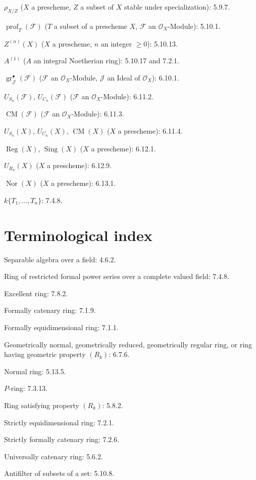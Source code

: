 $\rho_{X/Z}$ ($X$ a prescheme, $Z$ a subset of $X$ stable under
specialization): 5.9.7.

$\operatorname{prof}_T(\mathscr F)$ ($T$ a subset of a prescheme $X$,
$\mathscr F$ an $\mathcal O_X$-Module): 5.10.1.

$Z^{(n)}(X)$ ($X$ a prescheme, $n$ an integer $\geq0$): 5.10.13.

$A^{(1)}$ ($A$ an integral Noetherian ring): 5.10.17 and 7.2.1.

$\operatorname{gr}_{\mathscr J}^{\bullet}(\mathscr F)$ ($\mathscr F$ an
$\mathcal O_X$-Module, $\mathscr J$ an Ideal of $\mathcal O_X$): 6.10.1.

$U_{S_n}(\mathscr F)$, $U_{C_n}(\mathscr F)$ ($\mathscr F$ an
$\mathcal O_X$-Module): 6.11.2.

$\operatorname{CM}(\mathscr F)$ ($\mathscr F$ an $\mathcal O_X$-Module): 6.11.3.

$U_{S_n}(X)$, $U_{C_n}(X)$, $\operatorname{CM}(X)$ ($X$ a prescheme): 6.11.4.

$\operatorname{Reg}(X)$, $\operatorname{Sing}(X)$ ($X$ a prescheme): 6.12.1.

$U_{R_n}(X)$ ($X$ a prescheme): 6.12.9.

$\operatorname{Nor}(X)$ ($X$ a prescheme): 6.13.1.

$k\{T_1,\ldots,T_n\}$: 7.4.8.

\endgroup

\clearpage
{}
{}
\section*{Terminological index}

\begingroup
\footnotesize
\setlength{\parindent}{0pt}
\setlength{\parskip}{1.1pt}
\newcommand{\EGAIVtwoTermEN}[2]{#1: #2.\par}

\EGAIVtwoTermEN{Separable algebra over a field}{4.6.2}
\EGAIVtwoTermEN{Ring of restricted formal power series over a complete valued field}{7.4.8}
\EGAIVtwoTermEN{Excellent ring}{7.8.2}
\EGAIVtwoTermEN{Formally catenary ring}{7.1.9}
\EGAIVtwoTermEN{Formally equidimensional ring}{7.1.1}
\EGAIVtwoTermEN{Geometrically normal, geometrically reduced, geometrically
regular ring, or ring having geometric property $(R_k)$}{6.7.6}
\EGAIVtwoTermEN{Normal ring}{5.13.5}
\EGAIVtwoTermEN{$P$-ring}{7.3.13}
\EGAIVtwoTermEN{Ring satisfying property $(R_k)$}{5.8.2}
\EGAIVtwoTermEN{Strictly equidimensional ring}{7.2.1}
\EGAIVtwoTermEN{Strictly formally catenary ring}{7.2.6}
\EGAIVtwoTermEN{Universally catenary ring}{5.6.2}
\EGAIVtwoTermEN{Antifilter of subsets of a set}{5.10.8}

